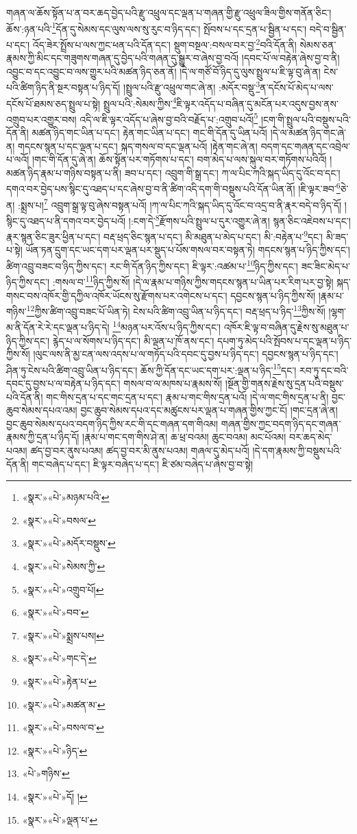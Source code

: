 གཞན་ལ་ཆོས་སྟོན་པ་ན་བར་ཆད་བྱེད་པའི་རྫུ་འཕྲུལ་དང་ལྡན་པ་གཞན་གྱི་རྫུ་འཕྲུལ་ཟིལ་གྱིས་གནོན་ཅིང་། ཆོས་:ཉན་པའི་\footnote{«སྣར་»«པེ་»མཉམ་པའི་}དོན་དུ་སེམས་དང་ལུས་ལས་སུ་རུང་བ་ཉིད་དང་། སྤོབས་པ་དང་དྲན་པ་སྦྱིན་པ་དང་། བདེ་བ་སྦྱིན་པ་དང་། འོད་ཟེར་སྤྲོས་པ་ལས་ཀྱང་ཕན་པའི་དོན་དང་། སྡུག་བསྔལ་:བསལ་བར་བྱ་\footnote{«སྣར་»«པེ་»བསལ་}བའི་དོན་ནི། སེམས་ཅན་རྣམས་ཀྱི་མིང་དང་གཟུགས་གཞན་དུ་བྱེད་པའི་གཞན་དུ་སྒྱུར་བ་ཞེས་བྱ་བའོ། །དབང་པོ་ལ་བརྟེན་ཞེས་བྱ་བ་ནི། འབྱུང་བ་དང་འབྱུང་བ་ལས་གྱུར་པའི་མཚན་ཉིད་ཅན་ནོ། །དེ་ལ་གཙོ་བོ་ཉིད་དུ་ལུས་སྤྲུལ་པ་ཇི་ལྟ་བུ་ཞེ་ན། ངེས་པའི་ཚིག་ཉིད་ནི་སྔར་བསྟན་པ་ཉིད་དོ། །སྤྲུལ་པའི་རྫུ་འཕྲུལ་གང་ཞེ་ན། :མདོར་བསྡུ་\footnote{«སྣར་»«པེ་»མདོར་བསྡུས་}ན་དངོས་པོ་མེད་པ་ལས་དངོས་པོ་ཐམས་ཅད་སྤྲུལ་པ་སྟེ། སྤྲུལ་པའི་:སེམས་ཀྱིས་\footnote{«སྣར་»«པེ་»སེམས་ཀྱི་}ཇི་ལྟར་འདོད་པ་བཞིན་དུ་མངོན་པར་འདུས་བྱས་ནས་འགྲུབ་པར་འགྱུར་བས། འདི་ལ་ཇི་ལྟར་འདོད་པ་ཞེས་བྱ་བའི་བརྗོད་པ་:འགྲུབ་པའོ།\footnote{«སྣར་»«པེ་»འགྲུབ་པོ།} །ངག་གི་སྤྲུལ་པའི་བསྡུས་པའི་དོན་ནི། མཚན་ཉིད་གང་ཡིན་པ་དང་། རྟེན་གང་ཡིན་པ་དང་། གང་གི་དོན་དུ་ཡིན་པའོ། །དེ་ལ་མཚན་ཉིད་གང་ཞེ་ན། གདངས་སྙན་པ་དང་ལྡན་པ་དང་། སྐད་གསལ་བ་དང་ལྡན་པའོ། །རྟེན་གང་ཞེ་ན། བདག་དང་གཞན་དང་འབྲེལ་པ་ལའོ། །གང་གི་དོན་དུ་ཞེ་ན། ཆོས་སྟོན་པར་གཏོགས་པ་དང་། བག་མེད་པ་ལས་སྐུལ་བར་གཏོགས་པའིའོ། །མཚན་ཉིད་རྣམ་པ་གཉིས་བསྟན་པ་ནི། ཟབ་པ་དང་། འབྲུག་གི་སྒྲ་དང་། ཀ་ལ་པིང་ཀའི་སྐད་ཡིད་དུ་འོང་བ་དང་། དགའ་བར་བྱེད་པས་སྙིང་དུ་འཐད་པ་དང་ཞེས་བྱ་བ་ནི་ཚིག་འདི་དག་གི་བསྡུས་པའི་དོན་ཡིན་ནོ། །ཇི་ལྟར་ཟབ་\footnote{«སྣར་»«པེ་»བབ་}ཅེ་ན། :སྨྲས་པ།\footnote{«སྣར་»«པེ་»སྨྲས་པས།} འབྲུག་སྒྲ་ལྟ་བུ་ཞེས་བསྟན་པའོ། །ཀ་ལ་པིང་ཀའི་སྐད་ཡིད་དུ་འོང་བ་འདྲ་བ་ནི་རྣར་བདེ་བ་ཉིད་དོ། །སྙིང་དུ་འཐད་པ་ནི་དགའ་བར་བྱེད་པའོ། །:ངག་དེ་\footnote{«སྣར་»«པེ་»གང་དེ་}རྫོགས་པའི་སྤྲུལ་པ་དུར་འགྱུར་ཞེ་ན། སྙན་ཅིང་འཇེབས་པ་དང་། རྣར་སྙན་ཅིང་ཟུར་ཕྱིན་པ་དང་། བརྡ་ཕྲད་ཅིང་སྙན་པ་དང་། མི་མཐུན་པ་མེད་པ་དང་། མི་:བརྟེན་པ་\footnote{«སྣར་»«པེ་»རྟེན་པ་}དང་། མི་ཟད་པ་སྟེ། ཡོན་ཏན་དྲུག་དང་ཡང་དག་པར་ལྡན་པར་སྡུད་པ་པོས་གསལ་བར་བསྟན་ཏེ། གདངས་སྙན་པ་ཉིད་ཀྱིས་དང་། ཚིག་འབྲུ་བཟང་བ་ཉིད་ཀྱིས་དང་། རང་གི་དོན་ཉིད་ཀྱིས་དང་། ཇི་ལྟར་:འཚམ་པ་\footnote{«སྣར་»«པེ་»མཚན་མ་}ཉིད་ཀྱིས་དང་། ཟང་ཟིང་མེད་པ་ཉིད་ཀྱིས་དང་། :གསལ་བ་\footnote{«སྣར་»«པེ་»བསལ་བ་}ཉིད་ཀྱིས་སོ། །དེ་ལ་རྣམ་པ་གཉིས་ཀྱིས་གདངས་སྙན་པ་ཡིན་པར་རིག་པར་བྱ་སྟེ། སྐད་གསང་བས་འཁོར་གྱི་དཀྱིལ་འཁོར་ཡོངས་སུ་རྫོགས་པར་འགེངས་པ་དང་། དབྱངས་སྙན་པ་ཉིད་ཀྱིས་སོ། །རྣམ་པ་གཉིས་\footnote{«སྣར་»«པེ་»ཉིད་}ཀྱིས་ཚིག་འབྲུ་བཟང་པོ་ཡིན་ཏེ། ངེས་པའི་ཚིག་འབྲུ་ཡིན་པ་ཉིད་དང་། བརྡ་ཕྲད་པ་ཉིད་\footnote{«པེ་»གཉིས་}ཀྱིས་སོ། །ལྷག་མ་ནི་དོན་རེ་རེ་དང་ལྡན་པ་ཉིད་དེ། \footnote{«སྣར་»«པེ་»དོ། ། }མཉན་པར་འོས་པ་ཉིད་ཀྱིས་དང་། འཁོར་ཇི་ལྟ་བ་བཞིན་དུ་རྗེས་སུ་མཐུན་པ་ཉིད་ཀྱིས་དང་། རྙེད་པ་ལ་སོགས་པ་ཉིད་དང་། མི་ལྡན་པ་ཁོ་ནས་དང་། དཔག་ཏུ་མེད་པའི་སྤོབས་པ་དང་ལྡན་པ་ཉིད་ཀྱིས་སོ། །ལུང་ལས་ནི་མྱ་ངན་ལས་འདས་པ་ལ་གཏོད་པའི་དབང་དུ་བྱས་པ་ཉིད་དང་། དབྱངས་སྙན་པ་ཉིད་དང་། ཤིན་ཏུ་ངེས་པའི་ཚིག་འབྲུ་ཡིན་པ་ཉིད་དང་། ཆོས་ཀྱི་དོན་དང་ཡང་དག་པར་:ལྡན་པ་ཉིད་\footnote{«སྣར་»«པེ་»ལྡན་པ་}དང་། རབ་ཏུ་དང་བའི་དབང་དུ་བྱས་པ་ལ་བརྟེན་པ་ཉིད་དང་། གསལ་བ་ལ་མཁས་པ་རྣམས་སོ། །སྔོན་གྱི་གནས་རྗེས་སུ་དྲན་པའི་བསྡུས་པའི་དོན་ནི། གང་གིས་དྲན་པ་དང་གང་དྲན་པ་དང་། རྣམ་པ་གང་གིས་དྲན་པའོ། །དེ་ལ་གང་གིས་དྲན་པ་ནི། བྱང་ཆུབ་སེམས་དཔའ་འམ། བྱང་ཆུབ་སེམས་དཔའ་དང་མཚུངས་པར་ལྡན་པ་གཞན་གྱིས་ཀྱང་ངོ། །གང་དྲན་ཞེ་ན། བྱང་ཆུབ་སེམས་དཔའ་བདག་ཉིད་ཀྱིས་རང་གི་དང་གཞན་དག་གིའམ། གཞན་གྱིས་ཀྱང་བདག་ཉིད་དང་གཞན་རྣམས་ཀྱི་དྲན་པ་ཉིད་དོ། །རྣམ་པ་གང་དག་གིས་ཤེ་ན། ཆ་ཕྲ་བའམ། ཆུང་བའམ། མང་པོའམ། བར་ཆད་མེད་པའམ། ཚད་བྱ་བར་ནུས་པའམ། ཚད་བྱ་བར་མི་ནུས་པའམ། གཞལ་དུ་མེད་པའོ། །དེ་དག་རྣམས་ཀྱི་བསྡུས་པའི་དོན་ནི། གང་བཞེད་པ་དང་། ཇི་ལྟར་བཞེད་པ་དང་། ཇི་ཙམ་བཞེད་པ་ཞེས་བྱ་བ་སྟེ། 